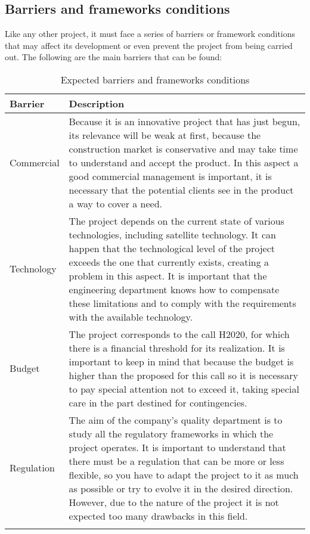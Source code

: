 \subsection{Barriers and frameworks conditions}

Like any other project, it must face a series of barriers or framework conditions that may affect its development or even prevent the project from being carried out. The following are the main barriers that can be found:

\begin{longtable}[H]{l p{12cm}}
		
		\toprule[2pt]
		
		\textbf{Barrier} &  \textbf{Description}\\
		
		\midrule [1.5pt]
		
		Commercial & Because it is an innovative project that has just begun, its relevance will be weak at first, because the construction market is conservative and may take time to understand and accept the product.
		In this aspect a good commercial management is important, it is necessary that the potential clients see in the product a way to cover a need.
		\vspace{0.2cm}\\
		
		\midrule
		
		Technology & The project depends on the current state of various technologies, including satellite technology. It can happen that the technological level of the project exceeds the one that currently exists, creating a problem in this aspect. It is important that the engineering department knows how to compensate these limitations and to comply with the requirements with the available technology.\vspace{0.2cm}\\
		
		\midrule
		
		Budget & The project corresponds to the call H2020, for which there is a financial threshold for its realization. It is important to keep in mind that because the budget is higher than the proposed for this call so it is necessary to pay special attention not to exceed it, taking special care in the part destined for contingencies.\vspace{0.2cm}\\
		
		\midrule
		
		Regulation & The aim of the company's quality department is to study all the regulatory frameworks in which the project operates. It is important to understand that there must be a regulation that can be more or less flexible, so you have to adapt the project to it as much as possible or try to evolve it in the desired direction. However, due to the nature of the project it is not expected too many drawbacks in this field.\vspace{0.2cm}\\
		
		
		\bottomrule[2pt]
		
	\caption{Expected barriers and frameworks conditions}
\end{longtable}